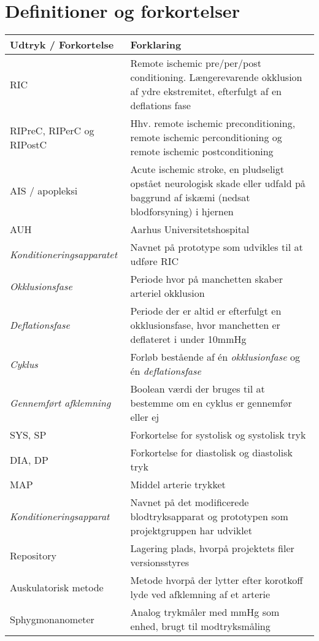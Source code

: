 \chapter*{Definitioner og forkortelser}
	\begin{longtable}{ |p{} |p{}| } 
		\hline
		\textbf{Udtryk / Forkortelse} &  \textbf{Forklaring} \\
		\hline
		RIC & Remote ischemic pre/per/post conditioning. Længerevarende okklusion af ydre ekstremitet, efterfulgt af en deflations fase\\
		\hline
		RIPreC, RIPerC og RIPostC & Hhv. remote ischemic preconditioning, remote ischemic perconditioning og remote ischemic postconditioning\\
		\hline
		AIS / apopleksi & Acute ischemic stroke, en pludseligt opstået neurologisk skade eller udfald på baggrund af iskæmi (nedsat blodforsyning) i hjernen \\
		\hline
		AUH & Aarhus Universitetshospital \\
		\hline
		\textit{Konditioneringsapparatet} & Navnet på prototype som udvikles til at udføre RIC \\
		\hline
		\textit{Okklusionsfase} & Periode hvor på manchetten skaber arteriel okklusion \\
		\hline
		\textit{Deflationsfase} & Periode der er altid er efterfulgt en okklusionsfase, hvor manchetten er deflateret i under 10mmHg\\
		\hline
		\textit{Cyklus} & Forløb bestående af én \textit{okklusionfase} og én \textit{deflationsfase} \\
		\hline
		\textit{Gennemført afklemning} & Boolean værdi der bruges til at bestemme om en cyklus er gennemfør eller ej \\
		\hline
		SYS, SP & Forkortelse for systolisk og systolisk tryk \\
		\hline
		DIA, DP & Forkortelse for diastolisk og diastolisk tryk \\
		\hline
		MAP & Middel arterie trykket \\
		\hline
		\textit{Konditioneringsapparat} & Navnet på det modificerede blodtryksapparat og prototypen som projektgruppen har udviklet \\
		\hline
		Repository & Lagering plads, hvorpå projektets filer versionsstyres \\
		\hline
		Auskulatorisk metode & Metode hvorpå der lytter efter korotkoff lyde ved afklemning af et arterie \\
		\hline
		Sphygmonanometer & Analog trykmåler med mmHg som enhed, brugt til modtryksmåling  \\
		\hline
	\end{longtable}
\newpage